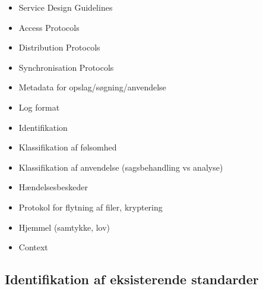 \begin{itemize}
\tightlist
\item
  Service Design Guidelines
\item
  Access Protocols
\item
  Distribution Protocols
\item
  Synchronisation Protocols
\item
  Metadata for opslag/søgning/anvendelse
\item
  Log format
\item
  Identifikation
\item
  Klassifikation af følsomhed
\item
  Klassifikation af anvendelse (sagsbehandling vs analyse)
\item
  Hændelsesbeskeder
\item
  Protokol for flytning af filer, kryptering
\item
  Hjemmel (samtykke, lov)
\item
  Context
\end{itemize}

\subsection{Identifikation af eksisterende
standarder}\label{identifikation-af-eksisterende-standarder}
